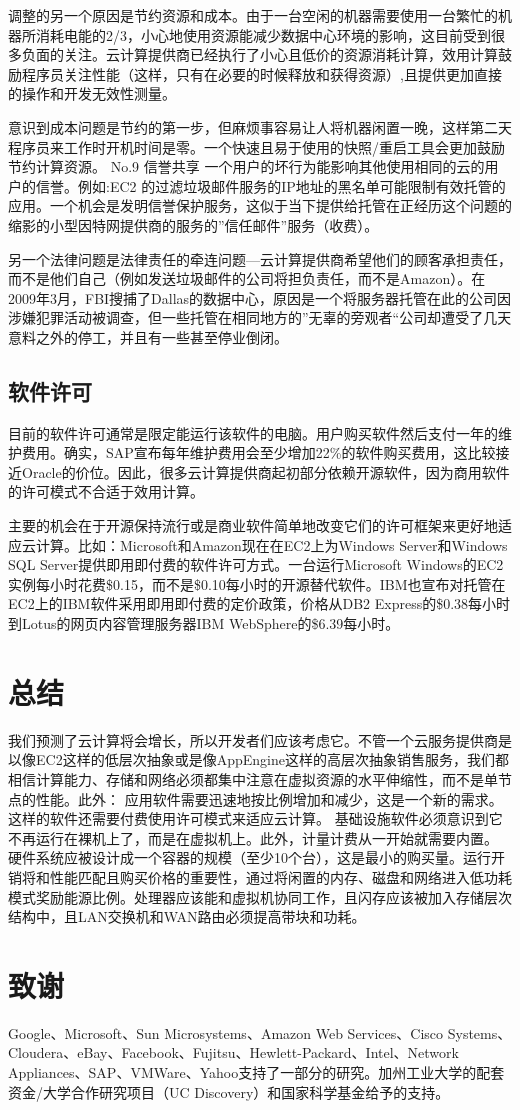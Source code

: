 调整的另一个原因是节约资源和成本。由于一台空闲的机器需要使用一台繁忙的机器所消耗电能的2/3，小心地使用资源能减少数据中心环境的影响，这目前受到很多负面的关注。云计算提供商已经执行了小心且低价的资源消耗计算，效用计算鼓励程序员关注性能（这样，只有在必要的时候释放和获得资源）,且提供更加直接的操作和开发无效性测量。

意识到成本问题是节约的第一步，但麻烦事容易让人将机器闲置一晚，这样第二天程序员来工作时开机时间是零。一个快速且易于使用的快照/重启工具会更加鼓励节约计算资源。
No.9 信誉共享
一个用户的坏行为能影响其他使用相同的云的用户的信誉。例如:EC2 的过滤垃圾邮件服务的IP地址的黑名单可能限制有效托管的应用。一个机会是发明信誉保护服务，这似于当下提供给托管在正经历这个问题的缩影的小型因特网提供商的服务的”信任邮件”服务（收费）。

另一个法律问题是法律责任的牵连问题—云计算提供商希望他们的顾客承担责任，而不是他们自己（例如发送垃圾邮件的公司将担负责任，而不是Amazon）。在2009年3月，FBI搜捕了Dallas的数据中心，原因是一个将服务器托管在此的公司因涉嫌犯罪活动被调查，但一些托管在相同地方的”无辜的旁观者“公司却遭受了几天意料之外的停工，并且有一些甚至停业倒闭。

\subsection{软件许可}

目前的软件许可通常是限定能运行该软件的电脑。用户购买软件然后支付一年的维护费用。确实，SAP宣布每年维护费用会至少增加22\%的软件购买费用，这比较接近Oracle的价位。因此，很多云计算提供商起初部分依赖开源软件，因为商用软件的许可模式不合适于效用计算。

主要的机会在于开源保持流行或是商业软件简单地改变它们的许可框架来更好地适应云计算。比如：Microsoft和Amazon现在在EC2上为Windows Server和Windows SQL Server提供即用即付费的软件许可方式。一台运行Microsoft Windows的EC2实例每小时花费\$0.15，而不是\$0.10每小时的开源替代软件。IBM也宣布对托管在EC2上的IBM软件采用即用即付费的定价政策，价格从DB2 Express的\$0.38每小时到Lotus的网页内容管理服务器IBM WebSphere的\$6.39每小时。

\section{总结}

我们预测了云计算将会增长，所以开发者们应该考虑它。不管一个云服务提供商是以像EC2这样的低层次抽象或是像AppEngine这样的高层次抽象销售服务，我们都相信计算能力、存储和网络必须都集中注意在虚拟资源的水平伸缩性，而不是单节点的性能。此外：
应用软件需要迅速地按比例增加和减少，这是一个新的需求。这样的软件还需要付费使用许可模式来适应云计算。
基础设施软件必须意识到它不再运行在裸机上了，而是在虚拟机上。此外，计量计费从一开始就需要内置。
硬件系统应被设计成一个容器的规模（至少10个台），这是最小的购买量。运行开销将和性能匹配且购买价格的重要性，通过将闲置的内存、磁盘和网络进入低功耗模式奖励能源比例。处理器应该能和虚拟机协同工作，且闪存应该被加入存储层次结构中，且LAN交换机和WAN路由必须提高带块和功耗。

\section*{致谢}

Google、Microsoft、Sun Microsystems、Amazon Web Services、Cisco Systems、Cloudera、eBay、Facebook、Fujitsu、Hewlett-Packard、Intel、Network Appliances、SAP、VMWare、Yahoo支持了一部分的研究。加州工业大学的配套资金/大学合作研究项目（UC Discovery）和国家科学基金给予的支持。
